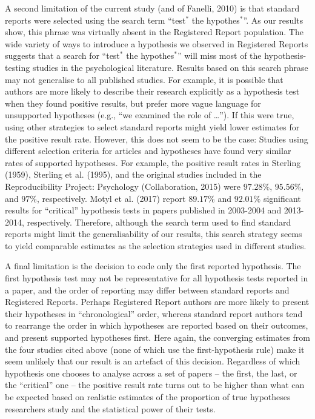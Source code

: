 \documentclass[british,,man,floatsintext]{apa6}
\begin{document}
A second limitation of the current study (and of Fanelli, 2010) is that standard reports were selected using the search term \enquote{test\(^\ast\) the hypothes\(^\ast\)}.
As our results show, this phrase was virtually absent in the Registered Report population.
The wide variety of ways to introduce a hypothesis we observed in Registered Reports suggests that a search for \enquote{test\(^\ast\) the hypothes\(^\ast\)} will miss most of the hypothesis-testing studies in the psychological literature.
Results based on this search phrase may not generalise to all published studies.
For example, it is possible that authors are more likely to describe their research explicitly as a hypothesis test when they found positive results, but prefer more vague language for unsupported hypotheses (e.g., \enquote{we examined the role of \ldots{}}).
If this were true, using other strategies to select standard reports might yield lower estimates for the positive result rate.
However, this does not seem to be the case:
Studies using different selection criteria for articles and hypotheses have found very similar rates of supported hypotheses.
For example, the positive result rates in Sterling (1959), Sterling et al. (1995), and the original studies included in the Reproducibility Project: Psychology (Collaboration, 2015) were \(97.28\%\), \(95.56\%\), and \(97\%\), respectively.
Motyl et al. (2017) report \(89.17\%\) and \(92.01\%\) significant results for \enquote{critical} hypothesis tests in papers published in 2003-2004 and 2013-2014, respectively.
Therefore, although the search term used to find standard reports might limit the generalisability of our results, this search strategy seems to yield comparable estimates as the selection strategies used in different studies.

A final limitation is the decision to code only the first reported hypothesis.
The first hypothesis test may not be representative for all hypothesis tests reported in a paper, and the order of reporting may differ between standard reports and Registered Reports.
Perhaps Registered Report authors are more likely to present their hypotheses in \enquote{chronological} order, whereas standard report authors tend to rearrange the order in which hypotheses are reported based on their outcomes, and present supported hypotheses first.
Here again, the converging estimates from the four studies cited above (none of which use the first-hypothesis rule) make it seem unlikely that our result is an artefact of this decision.
Regardless of which hypothesis one chooses to analyse across a set of papers -- the first, the last, or the \enquote{critical} one -- the positive result rate turns out to be higher than what can be expected based on realistic estimates of the proportion of true hypotheses researchers study and the statistical power of their tests.
\end{document}
